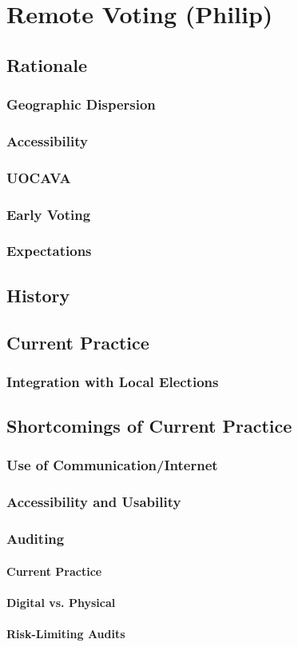 \chapter{Remote Voting (Philip)}

\section{Rationale}
\subsection{Geographic Dispersion}
\subsection{Accessibility}
\subsection{UOCAVA}
\subsection{Early Voting}
\subsection{Expectations}
\section{History}
\section{Current Practice}
\subsection{Integration with Local Elections}
\section{Shortcomings of Current Practice}
\subsection{Use of Communication/Internet}
\subsection{Accessibility and Usability}
\subsection{Auditing}
\subsubsection{Current Practice}
\subsubsection{Digital vs. Physical}
\subsubsection{Risk-Limiting Audits}

